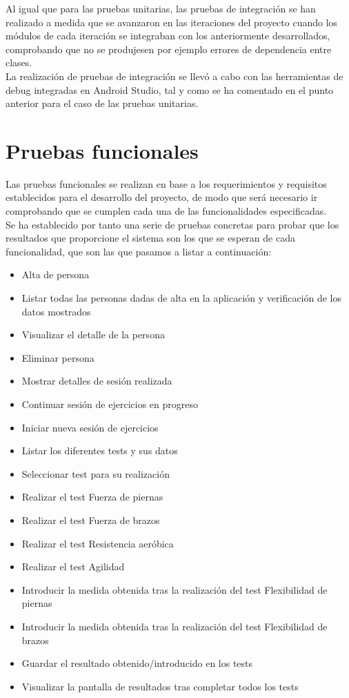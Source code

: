 Al igual que para las pruebas unitarias, las pruebas de integración se han realizado a medida que se avanzaron en las iteraciones del proyecto cuando los módulos de cada iteración se integraban con los anteriormente desarrollados, comprobando que no se produjesen por ejemplo errores de dependencia entre clases.\\

La realización de pruebas de integración se llevó a cabo con las herramientas de debug integradas en Android Studio, tal y como se ha comentado en el punto anterior para el caso de las pruebas unitarias.

\section{Pruebas funcionales}

Las pruebas funcionales se realizan en base a los requerimientos y requisitos establecidos para el desarrollo del proyecto, de modo que será necesario ir comprobando que se cumplen cada una de las funcionalidades especificadas.\\

Se ha establecido por tanto una serie de pruebas concretas para probar que los resultados que proporcione el sistema son los que se esperan de cada funcionalidad, que son las que pasamos a listar a continuación:

\begin{itemize}
\item Alta de persona
\item Listar todas las personas dadas de alta en la aplicación y verificación de los datos mostrados
\item Visualizar el detalle de la persona
\item Eliminar persona
\item Mostrar detalles de sesión realizada
\item Continuar sesión de ejercicios en progreso
\item Iniciar nueva sesión de ejercicios
\item Listar los diferentes tests y sus datos
\item Seleccionar test para su realización
\item Realizar el test Fuerza de piernas
\item Realizar el test Fuerza de brazos
\item Realizar el test Resistencia aeróbica
\item Realizar el test Agilidad
\item Introducir la medida obtenida tras la realización del test Flexibilidad de piernas
\item Introducir la medida obtenida tras la realización del test Flexibilidad de brazos
\item Guardar el resultado obtenido/introducido en los tests
\item Visualizar la pantalla de resultados tras completar todos los tests
\end{itemize}


